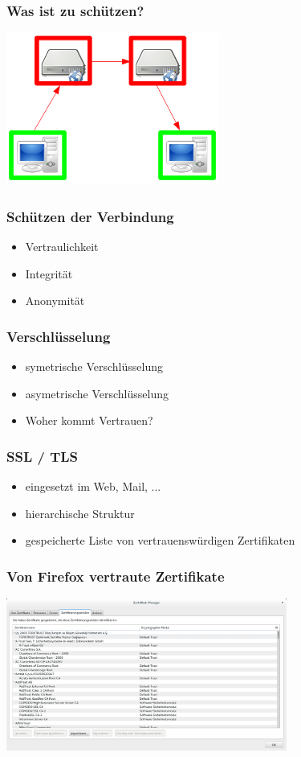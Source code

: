 \documentclass[12pt]{beamer}
\begin{document}
\begin{frame}
    \frametitle{Was ist zu schützen?}
    \begin{center}
      \includegraphics[height=5cm]{img/fed-clients.png}
    \end{center}
\end{frame}

\begin{frame}
    \frametitle{Schützen der Verbindung}
    \begin{itemize}
      \item Vertraulichkeit
      \item Integrität
      \item Anonymität
    \end{itemize}
\end{frame}

\begin{frame}
    \frametitle{Verschlüsselung}
    \begin{itemize}
      \item<2-> symetrische Verschlüsselung
      \item<3-> asymetrische Verschlüsselung
      \item<4-> Woher kommt Vertrauen?
    \end{itemize}
\end{frame}

\begin{frame}
    \frametitle{SSL / TLS}
    \begin{itemize}
      \item<2-> eingesetzt im Web, Mail, ...
      \item<3-> hierarchische Struktur
      \item<4-> gespeicherte Liste von vertrauenswürdigen Zertifikaten
    \end{itemize}
\end{frame}

\begin{frame}
    \frametitle{Von Firefox vertraute Zertifikate}
    \begin{center}
      \includegraphics[height=5cm]{img/zertifikate.png}
    \end{center}
\end{frame}
\end{document}
